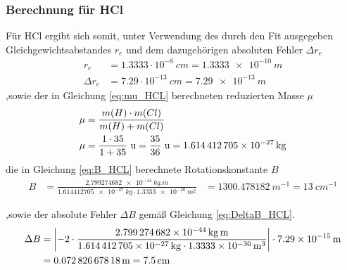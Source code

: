 \subsubsection*{Berechnung für HCl}
Für HCl ergibt sich somit, unter Verwendung des durch den Fit ausgegeben Gleichgewichtsabstandes $r_e$ und dem dazugehörigen absoluten Fehler $\Delta r_e$
\begin{align}
\label{eq:re_HCL}
r_e &= 1.3333 \cdot 10^{-8} ~\si{cm}=\SI[mode=math]{1.3333e-10}{m}
\\
\Delta r_e &= 7.29 \cdot 10^{-13} ~\si{cm}=\SI[mode=math]{7.29e-13}{m}
\end{align}
,sowie der in Gleichung \ref{eq:mu_HCL} berechneten reduzierten Masse $\mu$
\begin{align}
\mu&= \frac{m(H)\cdot m(Cl)}{m(H)+m(Cl)}\notag\\
\mu&= \frac{1\cdot35}{1+35} ~\si{u}=\frac{35}{36}~\si{u}=\SI[mode=math]{1.614412705e-27}{kg}\label{eq:mu_HCL}
\end{align}
die in Gleichung \ref{eq:B_HCL} berechnete Rotationskonstante $B$
\begin{align}
\label{eq:B_HCL}
B &=\frac{\SI[mode=math]{2.799274682e-44}{kg.m}}{\SI[mode=math]{1.614412705e-27}{kg}\cdot\SI[mode=math]{1.3333e-20}{m^{2}}}
&=\SI[mode=math]{1300.478182}{m^{-1}}
=\SI[mode=math]{13}{cm^{-1}}
\end{align}


,sowie der absolute Fehler $\Delta B$  gemäß Gleichung  \ref{eq:DeltaB_HCL}.  
\begin{align}
\Delta B &= \left|-2\cdot \frac{\SI[mode=math]{2.799274682e-44}{kg.m}}{\SI[mode=math]{1.614412705e-27}{kg}\cdot\SI[mode=math]{1.3333e-30}{m^{3}}}\right| \cdot \SI[mode=math]{7.29e-15}{m}
\notag\\
&=  \SI[mode=math]{0.07282667818}{m}= \SI[mode=math]{7.5}{cm} \label{eq:DeltaB_HCL}
\end{align} 






